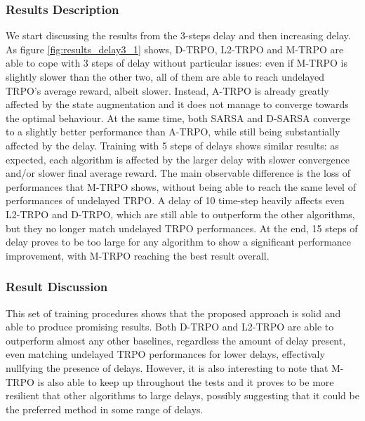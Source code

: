             \subsubsection{Results Description}
                We start discussing the results from the 3-steps delay and then increasing delay. As figure \ref{fig:results_delay3_1} shows, D-TRPO, L2-TRPO and M-TRPO are able to cope with 3 steps of delay without particular issues: even if M-TRPO is slightly slower than the other two, all of them are able to reach undelayed TRPO's average reward, albeit slower. Instead, A-TRPO is already greatly affected by the state augmentation and it does not manage to converge towards the optimal behaviour. At the same time, both SARSA and D-SARSA converge to a slightly better performance than A-TRPO, while still being substantially affected by the delay.\newline
                Training with 5 steps of delays shows similar results: as expected, each algorithm is affected by the larger delay with slower convergence and/or slower final average reward. The main observable difference is the loss of performances that M-TRPO shows, without being able to reach the same level of performances of undelayed TRPO.\newline
                A delay of 10 time-step heavily affects even L2-TRPO and D-TRPO, which are still able to outperform the other algorithms, but they no longer match undelayed TRPO performances. At the end, 15 steps of delay proves to be too large for any algorithm to show a significant performance improvement, with M-TRPO reaching the best result overall.
            
            \subsubsection{Result Discussion}
                This set of training procedures shows that the proposed approach is solid and able to produce promising results. Both D-TRPO and L2-TRPO are able to outperform almost any other baselines, regardless the amount of delay present, even matching undelayed TRPO performances for lower delays, effectivaly nullfying the presence of delays. However, it is also interesting to note that M-TRPO is also able to keep up throughout the tests and it proves to be more resilient that other algorithms to large delays, possibly suggesting that it could be the preferred method in some range of delays. 
            
